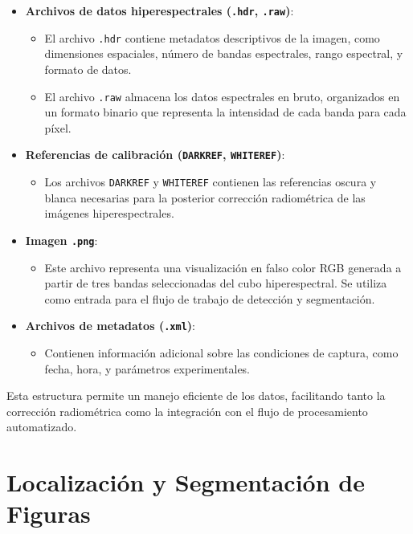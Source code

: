 \begin{itemize}
    \item \textbf{Archivos de datos hiperespectrales (\texttt{.hdr}, \texttt{.raw})}: 
    \begin{itemize}
        \item El archivo \texttt{.hdr} contiene metadatos descriptivos de la imagen, como dimensiones espaciales, número de bandas espectrales, rango espectral, y formato de datos.
        \item El archivo \texttt{.raw} almacena los datos espectrales en bruto, organizados en un formato binario que representa la intensidad de cada banda para cada píxel.
    \end{itemize}
    \item \textbf{Referencias de calibración (\texttt{DARKREF}, \texttt{WHITEREF})}: 
    \begin{itemize}
        \item Los archivos \texttt{DARKREF} y \texttt{WHITEREF} contienen las referencias oscura y blanca necesarias para la posterior corrección radiométrica de las imágenes hiperespectrales.
    \end{itemize}
    \item \textbf{Imagen \texttt{.png}}: 
    \begin{itemize}
        \item Este archivo representa una visualización en falso color RGB generada a partir de tres bandas seleccionadas del cubo hiperespectral. Se utiliza como entrada para el flujo de trabajo de detección y segmentación.
    \end{itemize}
    \item \textbf{Archivos de metadatos (\texttt{.xml})}: 
    \begin{itemize}
        \item Contienen información adicional sobre las condiciones de captura, como fecha, hora, y parámetros experimentales.
    \end{itemize}
\end{itemize}

Esta estructura permite un manejo eficiente de los datos, facilitando tanto la corrección radiométrica como la integración con el flujo de procesamiento automatizado.


\section{Localización y Segmentación de Figuras}

